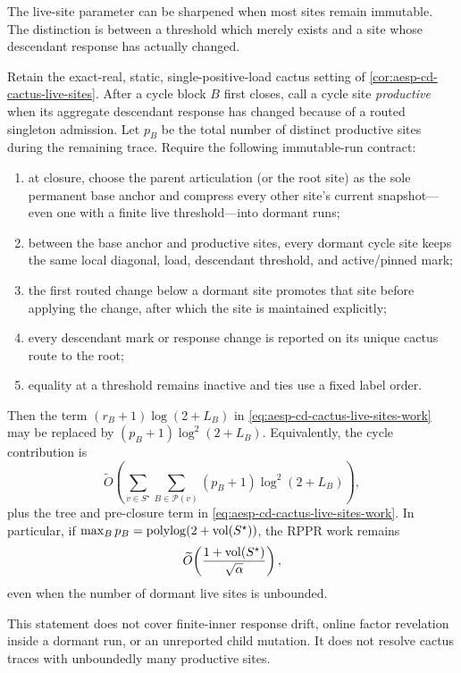 The live-site parameter can be sharpened when most sites remain immutable.
The distinction is between a threshold which merely exists and a site whose
descendant response has actually changed.

\begin{corollary}
\label{cor:aesp-cd-cactus-productive-sites}
Retain the exact-real, static, single-positive-load cactus setting of
\cref{cor:aesp-cd-cactus-live-sites}.  After a cycle block $B$ first closes,
call a cycle site \emph{productive} when its aggregate descendant response
has changed because of a routed singleton admission.  Let $p_B$ be the total
number of distinct productive sites during the remaining trace.  Require the
following immutable-run contract:
\begin{enumerate}[label=(\roman*)]
\item at closure, choose the parent articulation (or the root site) as the
      sole permanent base anchor and compress every other site's current
      snapshot---even one with a finite live threshold---into dormant runs;
\item between the base anchor and productive sites, every dormant cycle site keeps the same local
      diagonal, load, descendant threshold, and active/pinned mark;
\item the first routed change below a dormant site promotes that site before
      applying the change, after which the site is maintained explicitly;
\item every descendant mark or response change is reported on its unique
      cactus route to the root;
\item equality at a threshold remains inactive and ties use a fixed label
      order.
\end{enumerate}
Then the term $(r_B+1)\log(2+L_B)$ in
\cref{eq:aesp-cd-cactus-live-sites-work} may be replaced by
$(p_B+1)\log^2(2+L_B)$.  Equivalently, the cycle contribution is
\begin{equation}
 \widetilde O\!\left(
   \sum_{v\in S^\star}
   \sum_{B\in\mathcal P(v)}(p_B+1)\log^2(2+L_B)
 \right),
 \label{eq:aesp-cd-cactus-productive-sites-work}
\end{equation}
plus the tree and pre-closure term in
\cref{eq:aesp-cd-cactus-live-sites-work}.  In particular, if
$\max_B p_B=\operatorname{polylog}(2+\operatorname{vol}(S^\star))$, the RPPR work remains
\begin{equation*}
 \widetilde O\!\left(
  \frac{1+\operatorname{vol}(S^\star)}{\sqrt\alpha}
 \right),
\end{equation*}
even when the number of dormant live sites is unbounded.

This statement does not cover finite-inner response drift, online factor
revelation inside a dormant run, or an unreported child mutation.  It does not
resolve cactus traces with unboundedly many productive sites.
\end{corollary}

